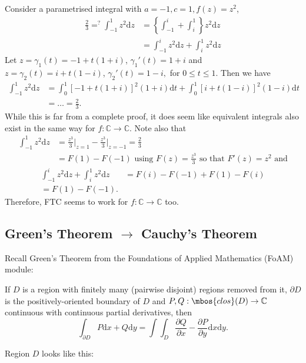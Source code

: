 Consider a parametrised integral with $a = -1, c = 1, f(z) = z^2$,
\begin{align*}
\frac{2}{3} =^? \int_{-1}^1 z^2 \mathrm{d}z &= \left\{ \int_{-1}^i + \int_i^1 \right \} z^2 \mathrm{d}z \\
&= \int_{-1}^i z^2 \mathrm{d}z + \int_{i}^1 z^2 \mathrm{d}z
\end{align*}
Let $z = \gamma_1(t) = -1 + t(1+i)$, $\gamma_1'(t) = 1 + i$ and $z = \gamma_2(t) = i + t(1-i)$, $\gamma_2'(t) = 1-i,$ for $0 \leq t \leq 1$. Then we have
\begin{align*}
\int_{-1}^1 z^2 \mathrm{d}z &=\int_{0}^1 [-1 + t(1+i)]^2(1+i) \mathrm{d}t + \int_{0}^1 [i + t(1-i)]^2(1-i) \mathrm{d}t \\
&=\ldots=\frac{2}{3}.
\end{align*}
While this is far from a complete proof, it does seem like equivalent integrals also exist in the same way for $f:\mathbb{C} \rightarrow \mathbb{C}$.
Note also that
\begin{align*}
\int_{-1}^1 z^2 \mathrm{d}z &= \frac{z^3}{3} \bigg\lvert_{z=1} - \frac{z^3}{3} \bigg\lvert_{z=-1} = \frac{2}{3} \\
&= F(1) - F(-1) \mbox{ using } F(z) = \frac{z^3}{3} \mbox{ so that } F'(z) = z^2 \mbox{ and}
\end{align*}
\begin{align*}
\int_{-1}^i z^2 \mathrm{d}z + \int_{i}^1 z^2 \mathrm{d}z &= F(i) - F(-1) + F(1) - F(i) \\
= F(1) - F(-1).
\end{align*}
Therefore, FTC seems to work for $f:\mathbb{C} \rightarrow \mathbb{C}$ too.

\subsection{Green's Theorem $\rightarrow$ Cauchy's Theorem}
Recall Green's Theorem from the Foundations of Applied Mathematics (FoAM) module:
\begin{thm}
If $D$ is a region with finitely many (pairwise disjoint) regions removed from it,
$\partial D$ is the positively-oriented boundary of $D$ and $P, Q: \mbos{clos}(D) \rightarrow \mathbb{C}$ continuous with continuous partial derivatives, then 
$$\int_{\partial D}P \mathrm{d}x + Q \mathrm{d}y = \int\int_D \frac{\partial Q}{\partial x} - \frac{\partial P}{\partial y} \mathrm{d}x\mathrm{d}y.$$
\end{thm}
Region $D$ looks like this:

